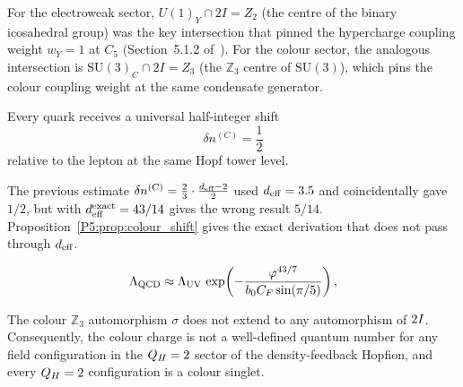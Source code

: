 

\begin{remark}
\label{P5:rem:ew_colour_parallel}
For the electroweak sector, $U(1)_Y\cap 2I = Z_2$ (the centre of the
binary icosahedral group) was the key intersection that pinned the
hypercharge coupling weight $w_Y=1$ at $C_5$ (Section~5.1.2 of~\cite{Paper1}).
For the colour sector, the analogous intersection is
$\mathrm{SU}(3)_C\cap 2I = Z_3$ (the $\mathbb{Z}_3$ centre of
$\mathrm{SU}(3)$), which pins the colour coupling weight at the
same condensate generator.
\end{remark}

\begin{proposition}
\label{P5:prop:colour_shift}
Every quark receives a universal half-integer shift
\begin{equation}
  \delta n^{(C)} = \frac{1}{2}
  \label{P16:eq:dncol_exact}
\end{equation}
relative to the lepton at the same Hopf tower level.
\end{proposition}

\begin{remark}
\label{P5:rem:old_formula_comparison}
The previous estimate $\delta n^{(C)} = \tfrac{2}{3}\cdot\tfrac{d_{\mathrm{eff}}-2}{2}$
used $d_{\mathrm{eff}} = 3.5$ and coincidentally gave $1/2$, but with
$d_{\mathrm{eff}}^{\mathrm{exact}}=43/14$ gives the wrong result $5/14$.
Proposition~\ref{P5:prop:colour_shift} gives the exact derivation that
does not pass through $d_{\mathrm{eff}}$.
\end{remark}

\begin{equation}
  \Lambda_{\mathrm{QCD}} \approx \Lambda_{\mathrm{UV}}\,\exp\!\left(-\frac{\varphi^{43/7}}{b_0 C_F \sin(\pi/5)}\right),
  \label{P16:eq:LQCD_holonomy}
\end{equation}

\begin{theorem}[Colour exclusion in the $\QH=2$ sector]
\label{P16:thm:colour_exclusion}
The colour $\mathbb{Z}_3$ automorphism $\sigma$ does not extend to any
automorphism of $2I$. Consequently, the colour charge is not a
well-defined quantum number for any field configuration in the
$\QH=2$ sector of the density-feedback Hopfion, and every $\QH=2$
configuration is a colour singlet.
\end{theorem}

